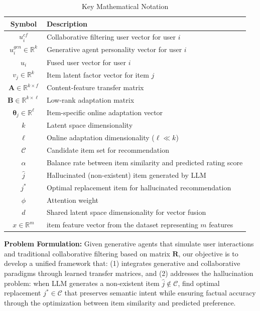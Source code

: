 \documentclass[acmsmall]{acmart}
\begin{document}
\begin{table}[h]
\centering
\caption{Key Mathematical Notation}
\label{tab:notation}
\begin{tabular}{cl}
\hline
\textbf{Symbol} & \textbf{Description} \\
\hline
$u^{cf}_i$ & Collaborative filtering user vector for user $i$ \\
$u^{gen}_i \in \mathbb{R}^k$ & Generative agent personality vector for user $i$ \\
$u_i$ & Fused user vector for user $i$ \\
$v_j \in \mathbb{R}^k$ & Item latent factor vector for item $j$ \\
$\mathbf{A} \in \mathbb{R}^{k \times f}$ & Content-feature transfer matrix \\
$\mathbf{B} \in \mathbb{R}^{k \times \ell}$ & Low-rank adaptation matrix \\
$\boldsymbol{\theta}_j \in \mathbb{R}^\ell$ & Item-specific online adaptation vector \\
$k$ & Latent space dimensionality \\
$\ell$ & Online adaptation dimensionality ($\ell \ll k$) \\
$\mathcal{C}$ & Candidate item set for recommendation \\
$\alpha$ & Balance rate between item similarity and predicted rating score \\ 
$\hat{j}$ & Hallucinated (non-existent) item generated by LLM \\
$j^*$ & Optimal replacement item for hallucinated recommendation \\
$\phi$ & Attention weight \\
$d$ & Shared latent space dimensionality for vector fusion \\
$x \in \mathbb{R}^m$ & item feature vector from the dataset representing $m$ features\\
\hline
\end{tabular}
\end{table}

\textbf{Problem Formulation:} Given generative agents that simulate user interactions and traditional collaborative filtering based on matrix $\mathbf{R}$, our objective is to develop a unified framework that: (1) integrates generative and collaborative paradigms through learned transfer matrices, and (2) addresses the hallucination problem: when LLM generates a non-existent item $\hat{j} \notin \mathcal{C}$, find optimal replacement $j^* \in \mathcal{C}$ that preserves semantic intent while ensuring factual accuracy through the optimization between item similarity and predicted preference.
\end{document}
